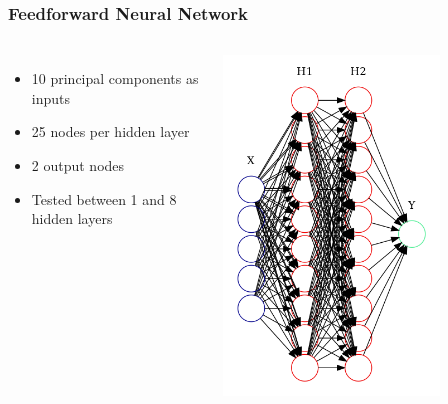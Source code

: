 \documentclass{beamer}
\begin{document}
\begin{frame}
	\frametitle{Feedforward Neural Network}
	\begin{columns}
		\begin{itemize}
			\item
				10 principal components as inputs
			\item
				25 nodes per hidden layer
			\item
				2 output nodes
			\item
				Tested between 1 and 8 hidden layers
				
		\end{itemize}
		\includegraphics[width=0.75\textwidth]{images/nngraph.png}
	\end{columns}
\end{frame}
\end{document}
